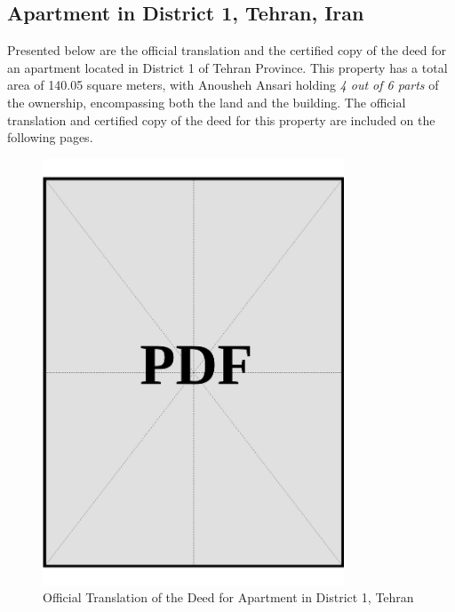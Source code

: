 \subsection{Apartment in District 1, Tehran, Iran}\label{sec:sponsor-apartment-dist1-tehran}

Presented below are the official translation and the certified copy of the deed for an apartment located in District 1 of Tehran Province. This property has a total area of 140.05 square meters, with Anousheh Ansari holding \textit{4 out of 6 parts} of the ownership, encompassing both the land and the building. The official translation and certified copy of the deed for this property are included on the following pages.


\vspace*{\fill}
\begin{figure}[h]
    \centering
    \includegraphics[page=1, width=0.8\textwidth]{../docs/sponsor/funds/property-deeds/property-1/official-translations.pdf}
    \caption{Official Translation of the Deed for Apartment in District 1, Tehran}
    \label{fig:sponsor-apartment-dist1-tehran-official-translation}
\end{figure}
\vspace*{\fill}


